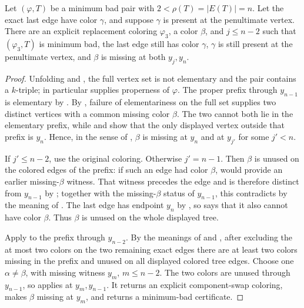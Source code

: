 \begin{helper}
Let \((\varphi,T)\) be a minimum bad pair with
\(2<\rho(T)=|E(T)|=n\).  Let the exact last edge have color
\(\gamma\), and suppose \(\gamma\) is present at the penultimate vertex.
There are an explicit replacement coloring \(\varphi_3\), a color
\(\beta\), and \(j\le n-2\) such that \((\varphi_3,T)\) is minimum bad,
the last edge still has color \(\gamma\), \(\gamma\) is still present at
the penultimate vertex, and \(\beta\) is missing at both \(y_j,y_n\).
\end{helper}
\begin{proof}
Unfolding  and
, the full vertex set is not elementary and the
pair contains a \(k\)-triple;  in particular supplies
properness of \(\varphi\).  The proper prefix through \(y_{n-1}\) is
elementary by .  By
, failure of elementariness on the
full set supplies two distinct vertices with a common missing color
\(\beta\).  The two cannot both lie in the elementary prefix, while
 and  show that the
only displayed vertex outside that prefix is \(y_n\).  Hence, in the
sense of , \(\beta\) is missing at \(y_n\) and at
\(y_{j'}\) for some \(j'<n\).

If \(j'\le n-2\), use the original coloring.  Otherwise \(j'=n-1\).
Then \(\beta\) is unused on the colored edges of the prefix: if such an
edge had color \(\beta\),  would provide an
earlier missing-\(\beta\) witness.  That witness precedes the edge and is
therefore distinct from \(y_{n-1}\) by ; together
with the missing-\(\beta\) status of \(y_{n-1}\), this contradicts
 by the meaning of
.  The last edge has endpoint \(y_n\) by
, so  says that it also
cannot have color \(\beta\).  Thus \(\beta\) is unused on the whole
displayed tree.

Apply  to the prefix through
\(y_{n-2}\).  By the meanings of  and
, after excluding the at most two colors on the
two remaining exact edges there are at least two colors missing in the
prefix and unused on all displayed colored tree edges.  Choose one
\(\alpha\ne\beta\), with missing witness \(y_m\), \(m\le n-2\).
The two colors are unused through \(y_{n-1}\), so
 applies at \(y_m,y_{n-1}\).
It returns an explicit component-swap coloring, makes \(\beta\) missing
at \(y_m\), and returns a minimum-bad certificate.


\end{proof}
